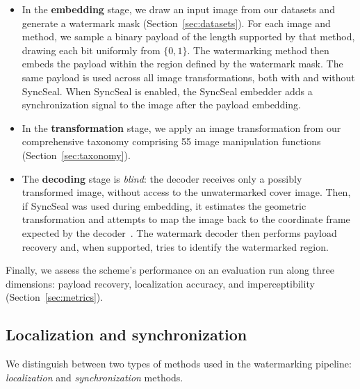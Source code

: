 \documentclass[sigconf,nonacm]{acmart}
\begin{document}
\begin{itemize}[leftmargin=*]
    \item In the {\bf embedding} stage, we draw an input image from our datasets and generate a watermark mask (Section~\ref{sec:datasets}). For each image and method, we sample a binary payload of the length supported by that method, drawing each bit uniformly from \(\{0,1\}\). The watermarking method then embeds the payload within the region defined by the watermark mask. The same payload is used across all image transformations, both with and without SyncSeal. When SyncSeal is enabled, the SyncSeal embedder adds a synchronization signal to the image after the payload embedding.

    \item In the {\bf transformation} stage, we apply an image transformation from our comprehensive taxonomy comprising 55 image manipulation functions (Section~\ref{sec:taxonomy}).

    \item The {\bf decoding} stage is {\it blind}: the decoder receives only a possibly transformed image, without access to the unwatermarked cover image. Then, if SyncSeal was used during embedding, it estimates the geometric transformation and attempts to map the image back to the coordinate frame expected by the decoder~\cite{syncseal}. The watermark decoder then performs payload recovery and, when supported, tries to identify the watermarked region.
\end{itemize}

\noindent
Finally, we assess the scheme's performance on an evaluation run along three dimensions: payload recovery, localization accuracy, and imperceptibility (Section~\ref{sec:metrics}).


\subsection{Localization and synchronization}\label{sec:methods}

We distinguish between two types of methods used in the watermarking pipeline: {\it localization} and {\it synchronization} methods.  
\end{document}
